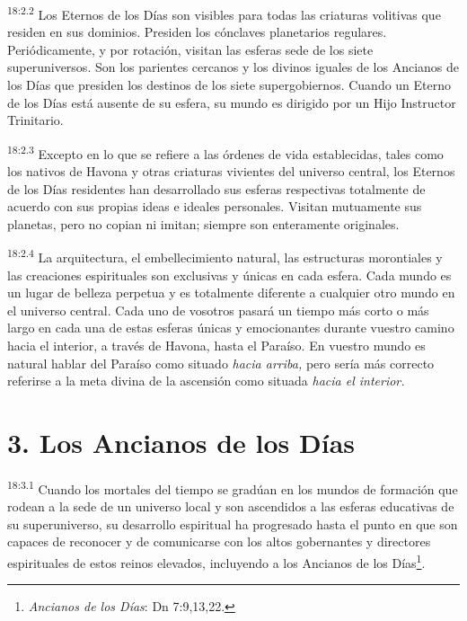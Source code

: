 \par
\textsuperscript{18:2.2} Los Eternos de los Días son visibles para todas las criaturas volitivas que residen en sus dominios. Presiden los cónclaves planetarios regulares. Periódicamente, y por rotación, visitan las esferas sede de los siete superuniversos. Son los parientes cercanos y los divinos iguales de los Ancianos de los Días que presiden los destinos de los siete supergobiernos. Cuando un Eterno de los Días está ausente de su esfera, su mundo es dirigido por un Hijo Instructor Trinitario.

\par
\textsuperscript{18:2.3} Excepto en lo que se refiere a las órdenes de vida establecidas, tales como los nativos de Havona y otras criaturas vivientes del universo central, los Eternos de los Días residentes han desarrollado sus esferas respectivas totalmente de acuerdo con sus propias ideas e ideales personales. Visitan mutuamente sus planetas, pero no copian ni imitan; siempre son enteramente originales.

\par
\textsuperscript{18:2.4} La arquitectura, el embellecimiento natural, las estructuras morontiales y las creaciones espirituales son exclusivas y únicas en cada esfera. Cada mundo es un lugar de belleza perpetua y es totalmente diferente a cualquier otro mundo en el universo central. Cada uno de vosotros pasará un tiempo más corto o más largo en cada una de estas esferas únicas y emocionantes durante vuestro camino hacia el interior, a través de Havona, hasta el Paraíso. En vuestro mundo es natural hablar del Paraíso como situado \textit{hacia arriba,} pero sería más correcto referirse a la meta divina de la ascensión como situada \textit{hacia el interior.}

\section*{3. Los Ancianos de los Días}
\par
\textsuperscript{18:3.1} Cuando los mortales del tiempo se gradúan en los mundos de formación que rodean a la sede de un universo local y son ascendidos a las esferas educativas de su superuniverso, su desarrollo espiritual ha progresado hasta el punto en que son capaces de reconocer y de comunicarse con los altos gobernantes y directores espirituales de estos reinos elevados, incluyendo a los Ancianos de los Días\footnote{\textit{Ancianos de los Días}: Dn 7:9,13,22.}.

